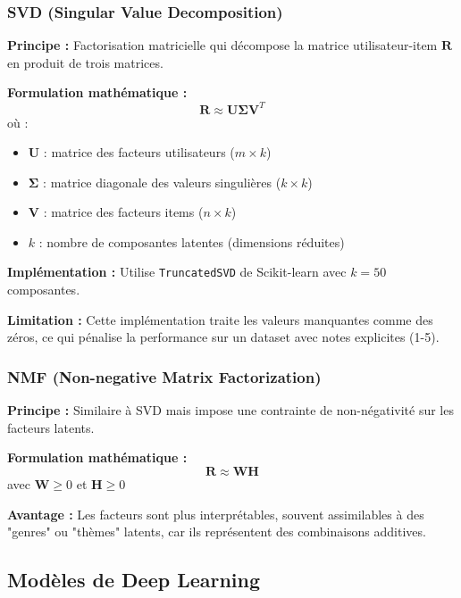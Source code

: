\documentclass[12pt,a4paper]{article}
\begin{document}
\subsubsection{SVD (Singular Value Decomposition)}

\textbf{Principe :} Factorisation matricielle qui décompose la matrice utilisateur-item $\mathbf{R}$ en produit de trois matrices.

\textbf{Formulation mathématique :}
\begin{equation}
    \mathbf{R} \approx \mathbf{U} \mathbf{\Sigma} \mathbf{V}^T
\end{equation}
où :
\begin{itemize}
    \item $\mathbf{U}$ : matrice des facteurs utilisateurs ($m \times k$)
    \item $\mathbf{\Sigma}$ : matrice diagonale des valeurs singulières ($k \times k$)
    \item $\mathbf{V}$ : matrice des facteurs items ($n \times k$)
    \item $k$ : nombre de composantes latentes (dimensions réduites)
\end{itemize}

\textbf{Implémentation :} Utilise \texttt{TruncatedSVD} de Scikit-learn avec $k=50$ composantes.

\textbf{Limitation :} Cette implémentation traite les valeurs manquantes comme des zéros, ce qui pénalise la performance sur un dataset avec notes explicites (1-5).

\subsubsection{NMF (Non-negative Matrix Factorization)}

\textbf{Principe :} Similaire à SVD mais impose une contrainte de non-négativité sur les facteurs latents.

\textbf{Formulation mathématique :}
\begin{equation}
    \mathbf{R} \approx \mathbf{W} \mathbf{H}
\end{equation}
avec $\mathbf{W} \geq 0$ et $\mathbf{H} \geq 0$

\textbf{Avantage :} Les facteurs sont plus interprétables, souvent assimilables à des "genres" ou "thèmes" latents, car ils représentent des combinaisons additives.

\subsection{Modèles de Deep Learning}
\end{document}
